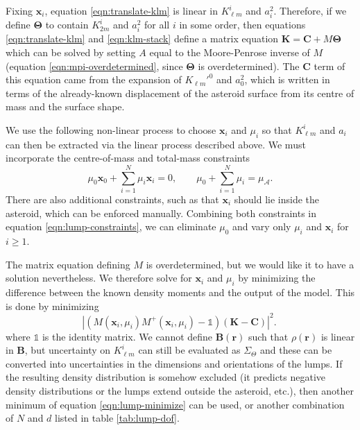 \documentclass[fleqn,usenatbib]{mnras}
\begin{document}
Fixing $\bm x_i$, equation \ref{eqn:translate-klm} is linear in $K_{\ell m}^i$ and $a_i^2$. Therefore, if we define $\bm \Theta$ to contain $K_{2m}^i$ and $a_i^2$ for all $i$ in some order, then equations \ref{eqn:translate-klm} and \ref{eqn:klm-stack} define a matrix equation $\bm K = \bm C + M \bm \Theta$ which can be solved by setting $A$ equal to the Moore-Penrose inverse of $M$ (equation \ref{eqn:mpi-overdetermined}, since $\bm \Theta$ is overdetermined). The $\bm C$ term of this equation came from the expansion of $K_{\ell m}'^0$ and $a_0^2$, which is written in terms of the already-known displacement of the asteroid surface from its centre of mass and the surface shape.

We use the following non-linear process to choose $\bm x_i$ and $\mu_i$ so that $K_{\ell m}^i$ and $a_i$ can then be extracted via the linear process described above. We must incorporate the centre-of-mass and total-mass constraints
\begin{equation}
  \mu_0 \bm x_0 + \sum_{i=1}^N \mu_i \bm x_i = 0, \qquad \mu_0 + \sum_{i=1}^N \mu_i = \mu_\mathcal{A}.
  \label{eqn:lump-constraints}
\end{equation}
There are also additional constraints, such as that $\bm x_i$ should lie inside the asteroid, which can be enforced manually. Combining both constraints in equation \ref{eqn:lump-constraints}, we can eliminate $\mu_0$ and vary only $\mu_i$ and $\bm x_i$ for $i \geq 1$.

The matrix equation defining $M$ is overdetermined, but we would like it to have a solution nevertheless. We therefore solve for $\bm x_i$ and $\mu_i$ by minimizing the difference between the known density moments and the output of the model. This is done by minimizing
\begin{equation}
  |(M(\bm x_i, \mu_i) M^+(\bm x_i, \mu_i) - \mathds{1}) (\bm K - \bm C)|^2.\
  \label{eqn:lump-minimize}
\end{equation}
where $\mathds{1}$ is the identity matrix. We cannot define $\bm B(\bm r)$ such that $\rho(\bm r)$ is linear in $\bm B$, but uncertainty on $K_{\ell m}^i$ can still be evaluated as $\Sigma_\Theta$ and these can be converted into uncertainties in the dimensions and orientations of the lumps. If the resulting density distribution is somehow excluded (it predicts negative density distributions or the lumps extend outside the asteroid, etc.), then another minimum of equation \ref{eqn:lump-minimize} can be used, or another combination of $N$ and $d$ listed in table \ref{tab:lump-dof}.
\end{document}
